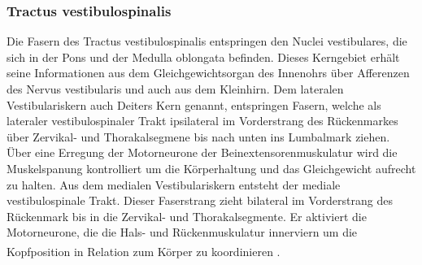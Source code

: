 \documentclass[12pt,a4paper,pdftex]{article}
\begin{document}
\subsubsection{Tractus vestibulospinalis} 
Die Fasern des Tractus vestibulospinalis entspringen den Nuclei vestibulares, die sich in der Pons und der Medulla oblongata befinden. Dieses Kerngebiet erhält seine Informationen aus dem Gleichgewichtsorgan des Innenohrs über Afferenzen des Nervus vestibularis und auch aus dem Kleinhirn. Dem lateralen Vestibulariskern auch Deiters Kern genannt, entspringen Fasern, welche als lateraler vestibulospinaler Trakt ipsilateral im Vorderstrang des Rückenmarkes über Zervikal- und Thorakalsegmene bis nach unten ins Lumbalmark ziehen. Über eine Erregung der Motorneurone der Beinextensorenmuskulatur wird die Muskelspanung kontrolliert um die Körperhaltung und das Gleichgewicht aufrecht zu halten. Aus dem medialen Vestibulariskern entsteht der mediale vestibulospinale Trakt. Dieser Faserstrang zieht bilateral im Vorderstrang des Rückenmark bis in die Zervikal- und Thorakalsegmente. Er aktiviert die Motorneurone, die die Hals- und Rückenmuskulatur innerviern um die Kopfposition in Relation zum Körper zu koordinieren \textsuperscript{\cite[14]{neurowissenschaften_baer} \cite[9]{crossman2014neuroanatomy} \cite[8]{paxinos2014rat}}.  
\end{document}
